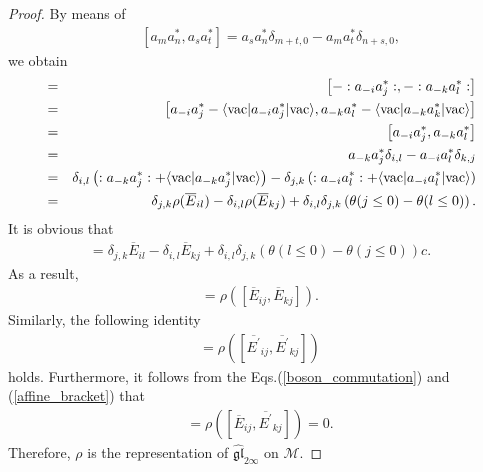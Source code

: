 \documentclass[11pt,reqno]{amsart}
\numberwithin{equation}{section}
\begin{document}
\begin{proof}
By means of
\begin{eqnarray}\label{boson_four_relation}
&&\left[a_{m}a^{\ast}_{n},a_{s}a^{\ast}_{t}\right]=a_{s}a^{\ast}_{n}\delta_{m+t,0}
-a_{m}a^{\ast}_{t}\delta_{n+s,0},
\end{eqnarray}
we obtain
\begin{eqnarray}
[\rho(\overline{E}_{ij}),\rho(\overline{E}_{kj})]
&=&\left[-:a_{-i}a^{\ast}_{j}:,
-:a_{-k}a^{\ast}_{l}:\right]\notag\\
&=&\left[a_{-i}a^{\ast}_{j}-\langle\text{vac}|a_{-i}a^{\ast}_{j}|\text{vac}\rangle,
a_{-k}a^{\ast}_{l}-\langle\text{vac}|a_{-k}a^{\ast}_{k}|\text{vac}\rangle\right]\notag\\
&=&\left[a_{-i}a^{\ast}_{j},a_{-k}a^{\ast}_{l}\right]\notag\\
&=&a_{-k}a^{\ast}_{j}\delta_{i,l}-a_{-i}a^{\ast}_{l}\delta_{k,j}\notag\\
&=&\delta_{i,l}\left(:a_{-k}a^{\ast}_{j}:+\langle\text{vac}|a_{-k}a^{\ast}_{j}|
\text{vac}\rangle\right)-\delta_{j,k}\left(:a_{-i}a^{\ast}_{l}:+\langle\text{vac}|a_{-i}
a^{\ast}_{l}|\text{vac}\rangle\right)\notag\\
&=&\delta_{j,k}\rho(\overline{E}_{il})-\delta_{i,l}\rho(\overline{E}_{kj})
+\delta_{i,l}\delta_{j,k}\left(\theta(j\leq0)-\theta(l\leq0)\right).
\end{eqnarray}
It is obvious that
\begin{eqnarray}
[\overline{E}_{ij},\overline{E}_{kj}]=\delta_{j,k}\overline{E}_{il}
-\delta_{i,l}\overline{E}_{kj}+\delta_{i,l}\delta_{j,k}
\left(\theta(l\leq0)-\theta(j\leq0)\right)c.
\end{eqnarray}
As a result,
\begin{eqnarray}
[\rho(\overline{E}_{ij}),\rho(\overline{E}_{kj})]=\rho\left(
[\overline{E}_{ij},\overline{E}_{kj}]\right).
\end{eqnarray}
Similarly, the following  identity
\begin{eqnarray}
[\rho(\overline{E^{\prime}}_{ij}),\rho(\overline{E^{\prime}}_{kj})]=\rho\left(
[\overline{E^{\prime}}_{ij},\overline{E^{\prime}}_{kj}]\right)
\end{eqnarray}
holds. Furthermore, it follows from the Eqs.(\ref{boson_commutation}) and (\ref{affine_bracket}) that
\begin{eqnarray}
[\rho(\overline{E}_{ij}),\rho(\overline{E^{\prime}}_{kj})]
=\rho\left([\overline{E}_{ij},\overline{E^{\prime}}_{kj}]\right)=0.
\end{eqnarray}
Therefore, $\rho$ is the representation of $\mathfrak{\widehat{gl}}_{2\infty}$ on $\mathcal{M}$.
\end{proof}
\end{document}
